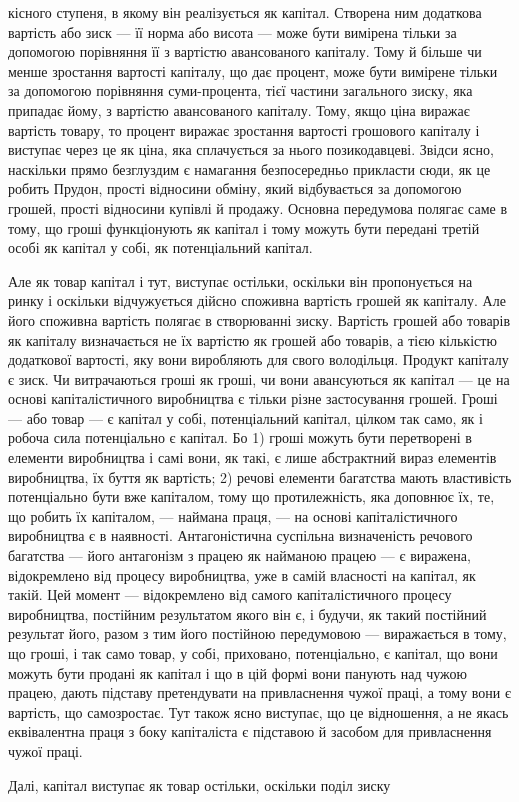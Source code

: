 кісного ступеня, в якому він реалізується як капітал. Створена
ним додаткова вартість або зиск — її норма або висота — може
бути вимірена тільки за допомогою порівняння її з вартістю
авансованого капіталу. Тому й більше чи менше зростання вартості
капіталу, що дає процент, може бути вимірене тільки
за допомогою порівняння суми-процента, тієї частини загального
зиску, яка припадає йому, з вартістю авансованого капіталу. Тому,
якщо ціна виражає вартість товару, то процент виражає зростання
вартості грошового капіталу і виступає через це як ціна,
яка сплачується за нього позикодавцеві. Звідси ясно, наскільки
прямо безглуздим є намагання безпосередньо прикласти сюди, як
це робить Прудон, прості відносини обміну, який відбувається за
допомогою грошей, прості відносини купівлі й продажу. Основна
передумова полягає саме в тому, що гроші функціонують як
капітал і тому можуть бути передані третій особі як капітал у
собі, як потенціальний капітал.

Але як товар капітал і тут, виступає остільки, оскільки він
пропонується на ринку і оскільки відчужується дійсно споживна
вартість грошей як капіталу. Але його споживна вартість полягає
в створюванні зиску. Вартість грошей або товарів як капіталу
визначається не їх вартістю як грошей або товарів, а тією
кількістю додаткової вартості, яку вони виробляють для свого
володільця. Продукт капіталу є зиск. Чи витрачаються гроші
як гроші, чи вони авансуються як капітал — це на основі капіталістичного
виробництва є тільки різне застосування грошей.
Гроші — або товар — є капітал у собі, потенціальний капітал, цілком
так само, як і робоча сила потенціально є капітал. Бо
1) гроші можуть бути перетворені в елементи виробництва і самі
вони, як такі, є лише абстрактний вираз елементів виробництва,
їх буття як вартість; 2) речові елементи багатства мають
властивість потенціально бути вже капіталом, тому що протилежність,
яка доповнює їх, те, що робить їх капіталом, — наймана
праця, — на основі капіталістичного виробництва є в наявності.
Антагоністична суспільна визначеність речового багатства —
його антагонізм з працею як найманою працею — є виражена,
відокремлено від процесу виробництва, уже в самій власності
на капітал, як такій. Цей момент — відокремлено від самого капіталістичного
процесу виробництва, постійним результатом якого
він є, і будучи, як такий постійний результат його, разом з тим
його постійною передумовою — виражається в тому, що гроші,
і так само товар, у собі, приховано, потенціально, є капітал, що
вони можуть бути продані як капітал і що в цій формі вони панують
над чужою працею, дають підставу претендувати на привласнення
чужої праці, а тому вони є вартість, що самозростає.
Тут також ясно виступає, що це відношення, а не якась еквівалентна
праця з боку капіталіста є підставою й засобом для привласнення
чужої праці.

Далі, капітал виступає як товар остільки, оскільки поділ зиску
